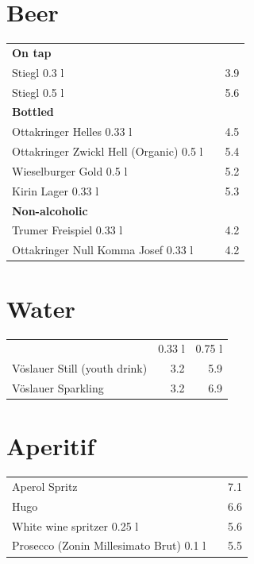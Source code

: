 \documentclass[a4paper,12pt]{article}
\begin{document}
\begin{multicols}{2}
\section*{Beer}
\begin{tabular}{Lrr}
\textbf{On tap}\\
\hspace{0.4cm}Stiegl 0.3 l & & 3.9\\
\hspace{0.4cm}Stiegl 0.5 l & & 5.6\vspace{0.1cm}\\
\textbf{Bottled}\\
\hspace{0.4cm}Ottakringer Helles 0.33 l & & 4.5\\
\hspace{0.4cm}Ottakringer Zwickl Hell (Organic) 0.5 l & & 5.4\\
\hspace{0.4cm}Wieselburger Gold 0.5 l & & 5.2\\
\hspace{0.4cm}Kirin Lager 0.33 l & & 5.3\vspace{0.1cm}\\
\textbf{Non-alcoholic}\\
\hspace{0.4cm}Trumer Freispiel 0.33 l & & 4.2\\
\hspace{0.4cm}Ottakringer Null Komma Josef 0.33 l & & 4.2
\end{tabular}

\columnbreak
\section*{Water}
\begin{tabular}{Lrr}
& 0.33 l & 0.75 l\\
Vöslauer Still (youth drink) & 3.2 & 5.9\\
Vöslauer Sparkling & 3.2 & 6.9
\end{tabular}

\section*{Aperitif}
\begin{tabular}{Lrr}
Aperol Spritz & & 7.1\\
Hugo & & 6.6\\
White wine spritzer 0.25 l & & 5.6\\
Prosecco (Zonin Millesimato Brut) 0.1 l & & 5.5
\end{tabular}


\end{multicols}
\end{document}
